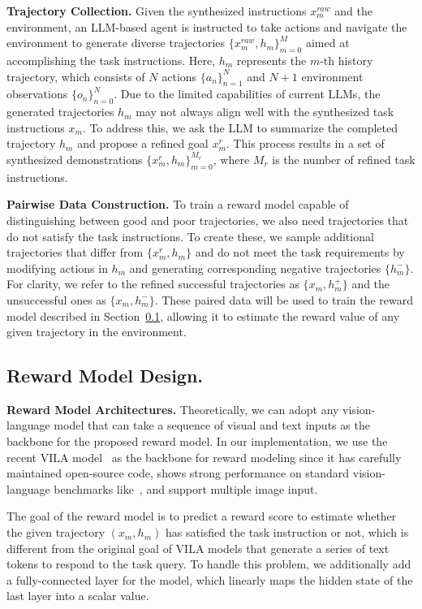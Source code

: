 \noindent\textbf{Trajectory Collection.} Given the synthesized instructions $x_m^{raw}$ and the environment, an LLM-based agent is instructed to take actions and navigate the environment to generate diverse trajectories $\{x_m^{raw}, h_m\}_{m=0}^M$ aimed at accomplishing the task instructions. Here, $h_m$ represents the $m$-th history trajectory, which consists of $N$ actions $\{a_n\}_{n=1}^N$ and $N+1$ environment observations $\{o_n\}_{n=0}^N$.
Due to the limited capabilities of current LLMs, the generated trajectories $h_m$ may not always align well with the synthesized task instructions $x_m$. To address this, we ask the LLM to summarize the completed trajectory $h_m$ and propose a refined goal $x_m^r$. This process results in a set of synthesized demonstrations $\{x_m^r, h_m\}_{m=0}^{M_r}$, where $M_r$ is the number of refined task instructions.

\noindent\textbf{Pairwise Data Construction.} 
To train a reward model capable of distinguishing between good and poor trajectories, we also need trajectories that do not satisfy the task instructions. To create these, we sample additional trajectories that differ from $\{x_m^r, h_m\}$ and do not meet the task requirements by modifying actions in $h_m$ and generating corresponding negative trajectories $\{h_m^-\}$. For clarity, we refer to the refined successful trajectories as $\{x_m, h_m^+\}$ and the unsuccessful ones as $\{x_m, h_m^-\}$. These paired data will be used to train the reward model described in Section~\ref{sec:model}, allowing it to estimate the reward value of any given trajectory in the environment.

\subsection{ Reward Model Design.} 
\label{sec:model}
\noindent\textbf{Reward Model Architectures.}
Theoretically, we can adopt any vision-language model that can take a sequence of visual and text inputs as the backbone for the proposed reward model. In our implementation, we use the recent VILA model~\citep{lin2023vila} as the backbone for reward modeling since it has carefully maintained open-source code, shows strong performance on standard vision-language benchmarks like~\citep{fu2023mme,balanced_vqa_v2,hudson2018gqa}, and support multiple image input. 

The goal of the reward model is to predict a reward score to estimate whether the given trajectory $(x_m, h_m)$  has satisfied the task instruction or not, which is different from the original goal of VILA models that generate a series of text tokens to respond to the task query. To handle this problem, we additionally add a fully-connected layer for the model, which linearly maps the hidden state of the last layer into a scalar value. 

